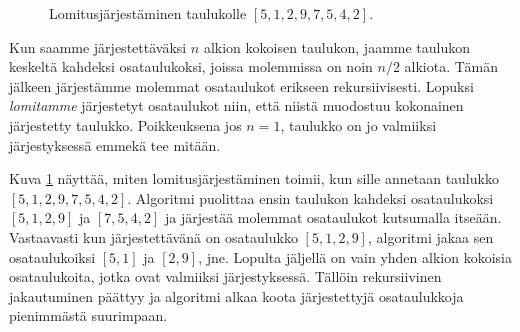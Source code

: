 \begin{figure}
\caption{Lomitusjärjestäminen taulukolle $[5,1,2,9,7,5,4,2]$.}
\label{fig:lomjar}
\end{figure}

Kun saamme järjestettäväksi $n$ alkion kokoisen taulukon,
jaamme taulukon keskeltä kahdeksi osataulukoksi,
joissa molemmissa on noin $n/2$ alkiota.
Tämän jälkeen järjestämme molemmat osataulukot erikseen rekursiivisesti.
Lopuksi \emph{lomitamme} järjestetyt osataulukot niin,
että niistä muodostuu kokonainen järjestetty taulukko.
Poikkeuksena jos $n=1$, taulukko on jo valmiiksi
järjestyksessä emmekä tee mitään.

Kuva \ref{fig:lomjar} näyttää, miten lomitusjärjestäminen
toimii, kun sille annetaan taulukko $[5,1,2,9,7,5,4,2]$.
Algoritmi puolittaa ensin taulukon kahdeksi osataulukoksi
$[5,1,2,9]$ ja $[7,5,4,2]$ ja järjestää molemmat
osataulukot kutsumalla itseään.
Vastaavasti kun järjestettävänä on osataulukko $[5,1,2,9]$,
algoritmi jakaa sen osataulukoiksi $[5,1]$ ja $[2,9]$, jne.
Lopulta jäljellä on vain yhden alkion kokoisia
osataulukoita, jotka ovat valmiiksi järjestyksessä.
Tällöin rekursiivinen jakautuminen päättyy ja algoritmi
alkaa koota järjestettyjä osataulukkoja pienimmästä suurimpaan.


